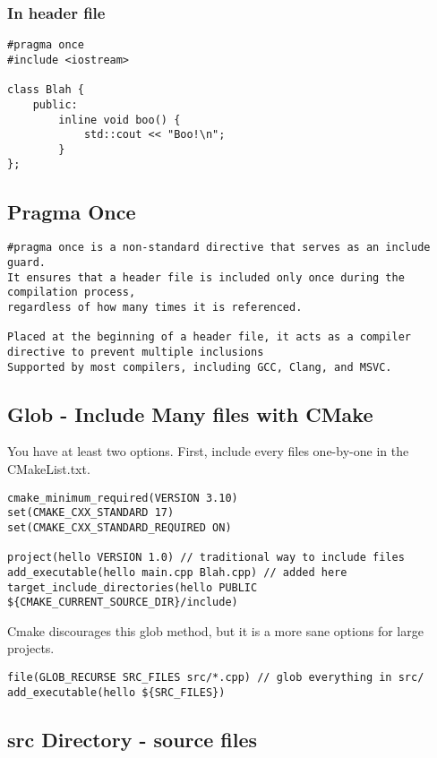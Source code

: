 \subsubsection{In header file}

\begin{verbatim}
#pragma once
#include <iostream>

class Blah {
    public:
        inline void boo() {
            std::cout << "Boo!\n";
        }
};
\end{verbatim}

\subsection{Pragma Once}

\begin{verbatim}
#pragma once is a non-standard directive that serves as an include guard. 
It ensures that a header file is included only once during the compilation process,
regardless of how many times it is referenced.

Placed at the beginning of a header file, it acts as a compiler directive to prevent multiple inclusions
Supported by most compilers, including GCC, Clang, and MSVC.
\end{verbatim}

\subsection{Glob - Include Many files with CMake}
 
You have at least two options. First, include every files one-by-one in the CMakeList.txt.
\begin{verbatim}
cmake_minimum_required(VERSION 3.10)
set(CMAKE_CXX_STANDARD 17)
set(CMAKE_CXX_STANDARD_REQUIRED ON)

project(hello VERSION 1.0) // traditional way to include files
add_executable(hello main.cpp Blah.cpp) // added here
target_include_directories(hello PUBLIC ${CMAKE_CURRENT_SOURCE_DIR}/include)
\end{verbatim}

Cmake discourages this glob method, but it is a more sane options for large projects.

\begin{verbatim}
file(GLOB_RECURSE SRC_FILES src/*.cpp) // glob everything in src/
add_executable(hello ${SRC_FILES})
\end{verbatim}

\subsection{src Directory - source files}

